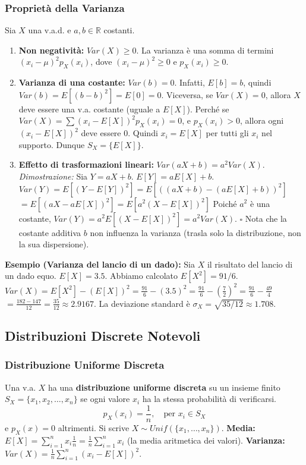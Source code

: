 \subsubsection{Proprietà della Varianza}
Sia $X$ una v.a.d. e $a, b \in \mathbb{R}$ costanti.
\begin{enumerate}
    \item \textbf{Non negatività:} $Var(X) \ge 0$.
    La varianza è una somma di termini $(x_i-\mu)^2 p_X(x_i)$, dove $(x_i-\mu)^2 \ge 0$ e $p_X(x_i) \ge 0$.
    \item \textbf{Varianza di una costante:} $Var(b) = 0$.
    Infatti, $E[b]=b$, quindi $Var(b) = E[(b-b)^2] = E[0] = 0$.
    Viceversa, se $Var(X)=0$, allora $X$ deve essere una v.a. costante (uguale a $E[X]$).
    Perché se $Var(X) = \sum (x_i - E[X])^2 p_X(x_i) = 0$, e $p_X(x_i)>0$, allora ogni $(x_i - E[X])^2$ deve essere 0. Quindi $x_i = E[X]$ per tutti gli $x_i$ nel supporto. Dunque $S_X=\{E[X]\}$.
    \item \textbf{Effetto di trasformazioni lineari:} $Var(aX + b) = a^2 Var(X)$.
    \textit{Dimostrazione:}
    Sia $Y = aX+b$. $E[Y] = aE[X]+b$.
    $Var(Y) = E[(Y - E[Y])^2] = E[((aX+b) - (aE[X]+b))^2]$
    $= E[(aX - aE[X])^2] = E[a^2(X - E[X])^2]$
    Poiché $a^2$ è una costante, $Var(Y) = a^2 E[(X - E[X])^2] = a^2 Var(X)$. $\square$
    Nota che la costante additiva $b$ non influenza la varianza (trasla solo la distribuzione, non la sua dispersione).
\end{enumerate}

\begin{example}
\textbf{Esempio (Varianza del lancio di un dado):}
Sia $X$ il risultato del lancio di un dado equo. $E[X] = 3.5$.
Abbiamo calcolato $E[X^2] = 91/6$.
$Var(X) = E[X^2] - (E[X])^2 = \frac{91}{6} - (3.5)^2 = \frac{91}{6} - (\frac{7}{2})^2 = \frac{91}{6} - \frac{49}{4}$
$= \frac{182 - 147}{12} = \frac{35}{12} \approx 2.9167$.
La deviazione standard è $\sigma_X = \sqrt{35/12} \approx 1.708$.
\end{example}

\subsection{Distribuzioni Discrete Notevoli}

\subsubsection{Distribuzione Uniforme Discreta}
Una v.a. $X$ ha una \textbf{distribuzione uniforme discreta} su un insieme finito $S_X = \{x_1, x_2, \dots, x_n\}$ se ogni valore $x_i$ ha la stessa probabilità di verificarsi.
\[ p_X(x_i) = \frac{1}{n}, \quad \text{per } x_i \in S_X \]
e $p_X(x)=0$ altrimenti. Si scrive $X \sim Unif(\{x_1, \dots, x_n\})$.
\textbf{Media:} $E[X] = \sum_{i=1}^n x_i \frac{1}{n} = \frac{1}{n} \sum_{i=1}^n x_i$ (la media aritmetica dei valori).
\textbf{Varianza:} $Var(X) = \frac{1}{n} \sum_{i=1}^n (x_i - E[X])^2$.

